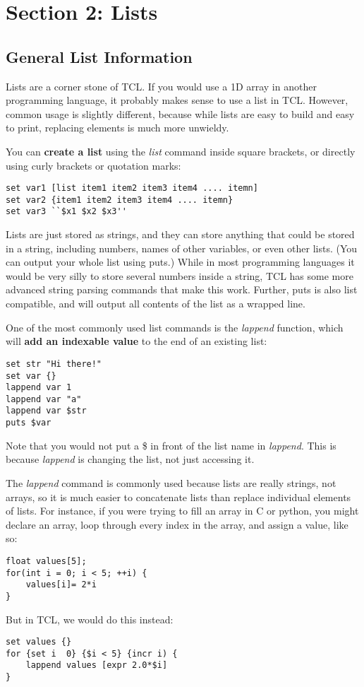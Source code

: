 \documentclass[letter,11pt]{article}
\begin{document}
\newpage
\section{Section 2: Lists}
\label{sec:list}
\subsection{General List Information}
\label{subsec:listgen}
Lists are a corner stone of TCL. If you would use a 1D array in another  programming language, it probably makes sense to use a list in TCL.  However, common usage is slightly different, because while lists are easy to build and easy to print, replacing elements is much more unwieldy. 

You can {\bf create a list} using the {\it list} command inside square brackets, or directly using curly brackets or quotation marks:
\begin{lstlisting}
set var1 [list item1 item2 item3 item4 .... itemn]
set var2 {item1 item2 item3 item4 .... itemn}
set var3 ``$x1 $x2 $x3''
\end{lstlisting}

Lists are just stored as strings, and they can store anything that could be stored in a string, including numbers, names of other variables, or even other lists. (You can output your whole list using puts.)  While in most programming languages it would be very silly to store several numbers inside a string, TCL has some more advanced string parsing commands that make this work. Further, puts is also list compatible, and will output all contents of the list as a wrapped line.

One of the most commonly used list commands is the {\it lappend} function, which will {\bf add an indexable value} to the end of an existing list:

\begin{lstlisting}
set str "Hi there!"
set var {}
lappend var 1 
lappend var "a"
lappend var $str
puts $var
\end{lstlisting}
Note that you would not put a \$ in front of the list name in {\it lappend}.  This is because {\it lappend} is changing the list, not just accessing it. 

The {\it lappend} command is commonly used because lists are really strings, not arrays, so it is much easier to concatenate lists than replace individual elements of lists.  For instance, if you were trying to fill an array in C or python, you might declare an array, loop through every index in the array, and assign a value, like so:
\begin{lstlisting}
float values[5]; 
for(int i = 0; i < 5; ++i) {
	values[i]= 2*i
}
\end{lstlisting}
But in TCL, we  would do this instead: 
\begin{lstlisting}
set values {}
for {set i  0} {$i < 5} {incr i) {
	lappend values [expr 2.0*$i]   
}
\end{lstlisting}
\end{document}
